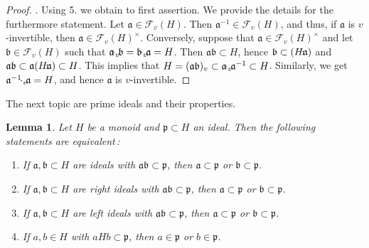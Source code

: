 \documentclass[a4paper]{amsart}
\newtheorem{lemma}[theorem]{Lemma}
\theoremstyle{definition}
\numberwithin{equation}{section}
\begin{document}
\begin{proof}
. Using 5. we obtain to first assertion. We provide the details for the
furthermore statement. Let $\mathfrak a \in \mathcal F_v (H)$. Then
$\mathfrak a^{-1} \in \mathcal F_v (H)$, and thus, if $\mathfrak a$
is $v$-invertible, then $\mathfrak a \in \mathcal F_v (H)^{\times}$.
Conversely, suppose that $\mathfrak a \in \mathcal F_v (H)^{\times}$
and let $\mathfrak b \in \mathcal F_v (H)$ such that $\mathfrak a
{\negthinspace \cdot_v \negthinspace} \mathfrak b = \mathfrak b {\negthinspace \cdot_v \negthinspace} \mathfrak a = H$. Then
$\mathfrak a \mathfrak b \subset H$, hence $\mathfrak b \subset (H
{\negthinspace : \negthinspace} \mathfrak a)$ and $\mathfrak a \mathfrak b \subset \mathfrak a
(H {\negthinspace : \negthinspace} \mathfrak a) \subset H$. This implies that $H = (\mathfrak a
\mathfrak b)_v \subset \mathfrak a {\negthinspace \cdot_v \negthinspace} \mathfrak a^{-1} \subset H$.
Similarly, we get $\mathfrak a^{-1} {\negthinspace \cdot_v \negthinspace} \mathfrak a = H$, and hence
$\mathfrak a$ is $v$-invertible.
\end{proof}

\smallskip
The next topic are prime ideals and their properties.

\medskip
\begin{lemma} \label{3.7}
Let $H$ be a monoid and $\mathfrak p \subset H$ an ideal. Then the
following statements are equivalent{\rm \,:}
\begin{enumerate}
\item[(a)] If $\mathfrak a, \mathfrak b \subset H$ are ideals with
           $\mathfrak a \mathfrak b \subset \mathfrak p$, then $\mathfrak a
           \subset \mathfrak p$ or $\mathfrak b \subset \mathfrak p$.

\smallskip
\item[(b)] If $\mathfrak a, \mathfrak b \subset H$ are right ideals with
           $\mathfrak a \mathfrak b \subset \mathfrak p$, then $\mathfrak a
           \subset \mathfrak p$ or $\mathfrak b \subset \mathfrak p$.

\smallskip
\item[(c)] If $\mathfrak a, \mathfrak b \subset H$ are left ideals with
           $\mathfrak a \mathfrak b \subset \mathfrak p$, then $\mathfrak a
           \subset \mathfrak p$ or $\mathfrak b \subset \mathfrak p$.

\smallskip
\item[(d)] If $a, b \in H$ with $aHb \subset \mathfrak p$, then $a
           \in \mathfrak p$ or $b \in \mathfrak p$.
\end{enumerate}
\end{lemma}
\end{document}
